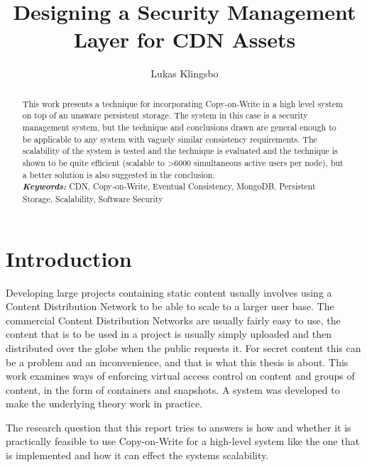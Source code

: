 \documentclass[a4paper,12pt]{article}
\title{\textbf{Designing a Security Management Layer for CDN Assets}}
\author{Lukas Klingsbo}
\providecommand{\keywords}[1]{\textbf{\textit{Keywords: }} #1}
\begin{document}
\maketitle
%

\setcounter{page}{1}

%

\begin{abstract}
This work presents a technique for incorporating Copy-on-Write in a high level system on top of an
unaware persistent storage. The system in this case is a security management system, but the
technique and conclusions drawn are general enough to be applicable to any system with vaguely
similar consistency requirements. The scalability of the system is tested and the technique is
evaluated and the technique is shown to be quite efficient (scalable to >6000 simultaneous active
users per node), but a better solution is also suggested in the conclusion.\\

\keywords{CDN, Copy-on-Write, Eventual Consistency, MongoDB, Persistent Storage, Scalability, 
Software Security}
\end{abstract}

\newpage\null\thispagestyle{empty}\newpage

\setcounter{tocdepth}{3}
\tableofcontents

\clearpage
{}
\setcounter{page}{1}

\section{Introduction}
Developing large projects containing static content usually involves using a Content Distribution
Network to be able to scale to a larger user base. The commercial Content Distribution Networks are
usually fairly easy to use, the content that is to be used in a project is usually simply uploaded
and then distributed over the globe when the public requests it. For secret content this can be a
problem and an inconvenience, and that is what this thesis is about. This work examines ways of
enforcing virtual access control on content and groups of content, in the form of containers and
snapshots. A system was developed to make the underlying theory work in practice. 

The research question that this report tries to answers is how and whether it is practically 
feasible to use Copy-on-Write for a high-level system like the one that is implemented and how 
it can effect the systems scalability. 
\end{document}
